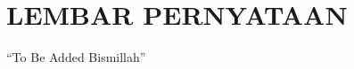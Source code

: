 \chapter*{\uppercase{LEMBAR PERNYATAAN}}
\vspace{1cm}

\begin{center}
    ``To Be Added Bismillah''
\end{center}

\newpage
